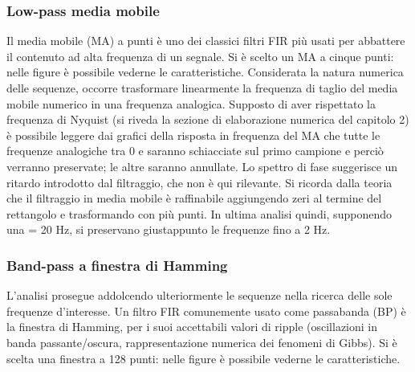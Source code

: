 		\subsubsection{Low-pass media mobile} %
Il media mobile (MA) a  punti è uno dei classici filtri FIR più usati per abbattere il contenuto ad alta frequenza di un segnale. Si è scelto un MA a cinque punti: nelle figure è possibile vederne le caratteristiche.
Considerata la natura numerica delle sequenze, occorre trasformare linearmente la frequenza di taglio del media mobile numerico in una frequenza analogica. Supposto di aver rispettato la frequenza di Nyquist (si riveda la sezione di elaborazione numerica del capitolo 2) è possibile leggere dai grafici della risposta in frequenza del MA che tutte le frequenze analogiche tra 0 e  saranno schiacciate sul primo campione e perciò verranno preservate; le altre saranno annullate. Lo spettro di fase suggerisce un ritardo introdotto dal filtraggio, che non è qui rilevante. Si ricorda dalla teoria che il filtraggio in media mobile è raffinabile aggiungendo zeri al termine del rettangolo  e trasformando con più punti. In ultima analisi quindi, supponendo una  = 20 Hz, si preservano giustappunto le frequenze fino a 2 Hz.
		\subsubsection{Band-pass a finestra di Hamming} %
L'analisi prosegue addolcendo ulteriormente le sequenze nella ricerca delle sole frequenze d'interesse. Un filtro FIR comunemente usato come passabanda (BP) è la finestra di Hamming, per i suoi accettabili valori di ripple (oscillazioni in banda passante/oscura, rappresentazione numerica dei fenomeni di Gibbs). Si è scelta una finestra a 128 punti: nelle figure è possibile vederne le caratteristiche.

